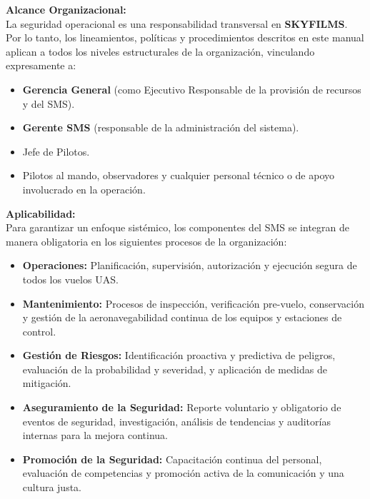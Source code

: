 \textbf{Alcance Organizacional:}\\
La seguridad operacional es una responsabilidad transversal en \textbf{SKYFILMS}. Por lo tanto, los lineamientos, políticas y procedimientos descritos en este manual aplican a todos los niveles estructurales de la organización, vinculando expresamente a:\\

\begin{itemize}
    \item \textbf{Gerencia General} (como Ejecutivo Responsable de la provisión de recursos y del SMS).

    \item \textbf{Gerente SMS} (responsable de la administración del sistema).

    \item Jefe de Pilotos.

    \item Pilotos al mando, observadores y cualquier personal técnico o de apoyo involucrado en la operación.
\end{itemize}


\textbf{Aplicabilidad:}\\
Para garantizar un enfoque sistémico, los componentes del SMS se integran de manera obligatoria en los siguientes procesos de la organización:\\

\begin{itemize}
    \item \textbf{Operaciones:} Planificación, supervisión, autorización y ejecución segura de todos los vuelos UAS.

    \item \textbf{Mantenimiento:} Procesos de inspección, verificación pre-vuelo, conservación y gestión de la aeronavegabilidad continua de los equipos y estaciones de control.

    \item \textbf{Gestión de Riesgos:} Identificación proactiva y predictiva de peligros, evaluación de la probabilidad y severidad, y aplicación de medidas de mitigación.

    \item \textbf{Aseguramiento de la Seguridad:} Reporte voluntario y obligatorio de eventos de seguridad, investigación, análisis de tendencias y auditorías internas para la mejora continua.

    \item \textbf{Promoción de la Seguridad:} Capacitación continua del personal, evaluación de competencias y promoción activa de la comunicación y una cultura justa.
\end{itemize}


